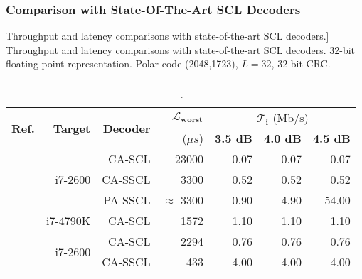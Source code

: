 \subsubsection{Comparison with State-Of-The-Art SCL Decoders}

\begin{table}[htp]
  \centering
  \caption
    [Throughput and latency comparisons with state-of-the-art SCL decoders.]
    {Throughput and latency comparisons with state-of-the-art SCL decoders.
    32-bit floating-point representation. Polar code (2048,1723), $L = 32$,
    32-bit CRC.}
  \label{tab:eval_polar_scl_perfs_comparison}
  \begin{tabular}{r r r r r r r}
    \multirow{2}{*}{\textbf{Ref.}}        & \multirow{2}{*}{\textbf{Target}} & \multirow{2}{*}{\textbf{Decoder}} & \multirow{1}{*}{\textbf{$\bm{\mathcal{L}_\text{worst}}$}} & \multicolumn{3}{c}{$\bm{\mathcal{T}_i}$ (Mb/s)} \\
    \cline{5-7}
                                          &                                  &                                   & ($\mu s$)                         & \textbf{3.5 dB} & \textbf{4.0 dB} & \textbf{4.5 dB} \\
    \hline
    \hline
    \multirow{3}{*}{\cite{Sarkis2014b}}   & \multirow{3}{*}{i7-2600}         & CA-SCL                            & 23000                             &  0.07           &  0.07           &   0.07          \\
                                          &                                  & CA-SSCL                           &  3300                             &  0.52           &  0.52           &   0.52          \\
                                          &                                  & PA-SSCL                           & $\approx$ 3300                    &  0.90           &  4.90           &  54.00          \\
    \hline
    \cite{Shen2016}                       & \multirow{1}{*}{i7-4790K}        & CA-SCL                            &  1572                             &  1.10           &  1.10           &   1.10          \\
    \hline
    \multirow{3}{*}{\cite{Sarkis2016}}    & \multirow{3}{*}{i7-2600}         & CA-SCL                            &  2294                             &  0.76           &  0.76           &   0.76          \\
                                          &                                  & CA-SSCL                           &   433                             &  4.00           &  4.00           &   4.00          \\

\end{tabular}
\end{table}
